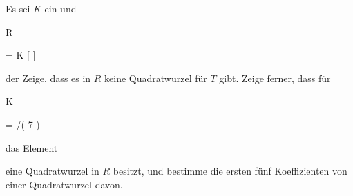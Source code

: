 {


Es sei $K$ ein
und


\mavergleichskette

{\vergleichskette

{ R
}

{ = }{ K [ \![ T ]\! ]
}

{  }{
}

{    }{
}

{   }{
}

}
{}{}{}
der
Zeige, dass es in $R$ keine Quadratwurzel für $T$ gibt. Zeige ferner, dass für


\mavergleichskette

{\vergleichskette

{ K
}

{ = }{ \Z/( 7 )
}

{  }{
}

{    }{
}

{   }{
}

}
{}{}{}
das Element

 eine Quadratwurzel in $R$ besitzt, und bestimme die ersten fünf Koeffizienten von einer Quadratwurzel davon.


}

{} {}



{}

